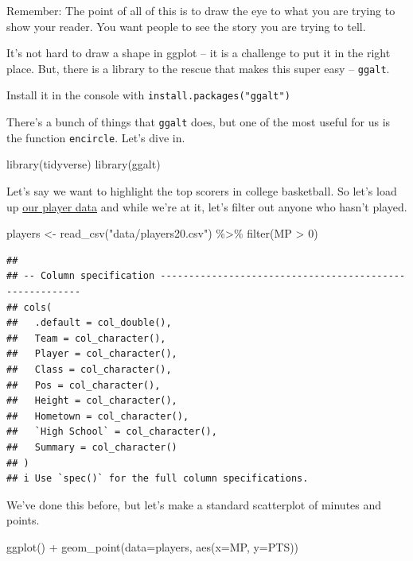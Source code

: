 \documentclass[
]{book}
\newenvironment{Shaded}{\begin{snugshade}}{\end{snugshade}}
\newcommand{\AttributeTok}[1]{\textcolor[rgb]{0.77,0.63,0.00}{#1}}
\newcommand{\DecValTok}[1]{\textcolor[rgb]{0.00,0.00,0.81}{#1}}
\newcommand{\FunctionTok}[1]{\textcolor[rgb]{0.00,0.00,0.00}{#1}}
\newcommand{\NormalTok}[1]{#1}
\newcommand{\OtherTok}[1]{\textcolor[rgb]{0.56,0.35,0.01}{#1}}
\newcommand{\SpecialCharTok}[1]{\textcolor[rgb]{0.00,0.00,0.00}{#1}}
\newcommand{\StringTok}[1]{\textcolor[rgb]{0.31,0.60,0.02}{#1}}
\begin{document}
Remember: The point of all of this is to draw the eye to what you are trying to show your reader. You want people to see the story you are trying to tell.

It's not hard to draw a shape in ggplot -- it is a challenge to put it in the right place. But, there is a library to the rescue that makes this super easy -- \texttt{ggalt}.

Install it in the console with \texttt{install.packages("ggalt")}

There's a bunch of things that \texttt{ggalt} does, but one of the most useful for us is the function \texttt{encircle}. Let's dive in.

\begin{Shaded}
\begin{Highlighting}[]
\FunctionTok{library}\NormalTok{(tidyverse)}
\FunctionTok{library}\NormalTok{(ggalt)}
\end{Highlighting}
\end{Shaded}

Let's say we want to highlight the top scorers in college basketball. So let's load up \href{https://unl.box.com/s/0g56ve61y6hakyxzr1u4t534721bqvg8}{our player data} and while we're at it, let's filter out anyone who hasn't played.

\begin{Shaded}
\begin{Highlighting}[]
\NormalTok{players }\OtherTok{\textless{}{-}} \FunctionTok{read\_csv}\NormalTok{(}\StringTok{"data/players20.csv"}\NormalTok{) }\SpecialCharTok{\%\textgreater{}\%} \FunctionTok{filter}\NormalTok{(MP }\SpecialCharTok{\textgreater{}} \DecValTok{0}\NormalTok{)}
\end{Highlighting}
\end{Shaded}

\begin{verbatim}
## 
## -- Column specification --------------------------------------------------------
## cols(
##   .default = col_double(),
##   Team = col_character(),
##   Player = col_character(),
##   Class = col_character(),
##   Pos = col_character(),
##   Height = col_character(),
##   Hometown = col_character(),
##   `High School` = col_character(),
##   Summary = col_character()
## )
## i Use `spec()` for the full column specifications.
\end{verbatim}

We've done this before, but let's make a standard scatterplot of minutes and points.

\begin{Shaded}
\begin{Highlighting}[]
\FunctionTok{ggplot}\NormalTok{() }\SpecialCharTok{+} \FunctionTok{geom\_point}\NormalTok{(}\AttributeTok{data=}\NormalTok{players, }\FunctionTok{aes}\NormalTok{(}\AttributeTok{x=}\NormalTok{MP, }\AttributeTok{y=}\NormalTok{PTS))}
\end{Highlighting}
\end{Shaded}
\end{document}

